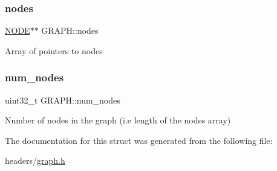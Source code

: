 \subsubsection{\texorpdfstring{nodes}{nodes}}
{\footnotesize\ttfamily \hyperlink{structNODE}{N\+O\+DE}$\ast$$\ast$ G\+R\+A\+P\+H\+::nodes}

Array of pointers to nodes \mbox{\label{structGRAPH_aff09b6a0b0bb17a3565cb92bfdff8017}} 
\subsubsection{\texorpdfstring{num\+\_\+nodes}{num\_nodes}}
{\footnotesize\ttfamily uint32\+\_\+t G\+R\+A\+P\+H\+::num\+\_\+nodes}

Number of nodes in the graph (i.\+e length of the nodes array) 

The documentation for this struct was generated from the following file\+:\begin{DoxyCompactItemize}
\item 
headers/\hyperlink{graph_8h}{graph.\+h}\end{DoxyCompactItemize}
